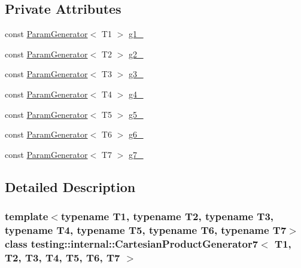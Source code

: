 \subsection*{\-Private \-Attributes}
\begin{DoxyCompactItemize}
\item 
const \hyperlink{classtesting_1_1internal_1_1ParamGenerator}{\-Param\-Generator}$<$ \-T1 $>$ \hyperlink{classtesting_1_1internal_1_1CartesianProductGenerator7_a315f81360fc67b016cbf514cb78c1975}{g1\-\_\-}
\item 
const \hyperlink{classtesting_1_1internal_1_1ParamGenerator}{\-Param\-Generator}$<$ \-T2 $>$ \hyperlink{classtesting_1_1internal_1_1CartesianProductGenerator7_a4bd40d1fbb8c6d2895b5201e62afbe38}{g2\-\_\-}
\item 
const \hyperlink{classtesting_1_1internal_1_1ParamGenerator}{\-Param\-Generator}$<$ \-T3 $>$ \hyperlink{classtesting_1_1internal_1_1CartesianProductGenerator7_acda98d4bf8f619856fb2e0ec015b9bc8}{g3\-\_\-}
\item 
const \hyperlink{classtesting_1_1internal_1_1ParamGenerator}{\-Param\-Generator}$<$ \-T4 $>$ \hyperlink{classtesting_1_1internal_1_1CartesianProductGenerator7_a1b3cef374aa9be9fbd4ed12caa7db9b5}{g4\-\_\-}
\item 
const \hyperlink{classtesting_1_1internal_1_1ParamGenerator}{\-Param\-Generator}$<$ \-T5 $>$ \hyperlink{classtesting_1_1internal_1_1CartesianProductGenerator7_a938d8dc16afe9878a43d89ce3cd87ad7}{g5\-\_\-}
\item 
const \hyperlink{classtesting_1_1internal_1_1ParamGenerator}{\-Param\-Generator}$<$ \-T6 $>$ \hyperlink{classtesting_1_1internal_1_1CartesianProductGenerator7_a905585e5d7722194673d92d7a29a2996}{g6\-\_\-}
\item 
const \hyperlink{classtesting_1_1internal_1_1ParamGenerator}{\-Param\-Generator}$<$ \-T7 $>$ \hyperlink{classtesting_1_1internal_1_1CartesianProductGenerator7_a55039ea79deff09f686dc351506af769}{g7\-\_\-}
\end{DoxyCompactItemize}


\subsection{\-Detailed \-Description}
\subsubsection*{template$<$typename T1, typename T2, typename T3, typename T4, typename T5, typename T6, typename T7$>$class testing\-::internal\-::\-Cartesian\-Product\-Generator7$<$ T1, T2, T3, T4, T5, T6, T7 $>$}



